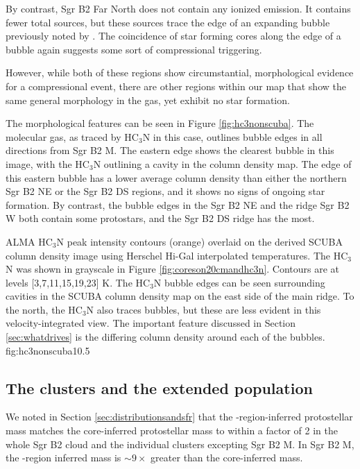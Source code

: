\documentclass[twocolumn]{aastex61}
\begin{document}
By contrast, Sgr B2 Far North does not contain any ionized emission.  It
contains fewer total sources, but these sources trace the edge of an expanding
bubble previously noted by \citet{de-Vicente1997a}.  The coincidence of star
forming cores along the edge of a bubble again suggests some sort of
compressional triggering.

However, while both of these regions show circumstantial, morphological evidence
for a compressional event, there are other regions within our map that show
the same general morphology in the gas, yet exhibit no star formation.

The morphological features can be seen in Figure \ref{fig:hc3nonscuba}.  The
molecular gas, as traced by HC$_3$N in this case, outlines bubble edges in all
directions from Sgr B2 M.  The eastern edge shows the clearest bubble in this
image, with the HC$_3$N outlining a cavity in the column density map.  The edge
of this eastern bubble has a lower average column density than either the
northern Sgr B2 NE or the Sgr B2 DS regions, and it shows no signs of ongoing
star formation.  By contrast, the bubble edges in the Sgr B2 NE and the ridge
Sgr B2 W both contain some protostars, and the Sgr B2 DS ridge has the most.

{ALMA HC$_3$N peak intensity contours (orange) overlaid on the derived SCUBA column density
image using Herschel Hi-Gal interpolated temperatures. The HC$_3$N was
shown in grayscale in Figure \ref{fig:coreson20cmandhc3n}.
Contours are at levels [3,7,11,15,19,23] K.  The  HC$_3$N bubble edges can be
seen surrounding cavities in the SCUBA column density map on the east side of
the main ridge.  To the north, the HC$_3$N also traces bubbles, but these are
less evident in this velocity-integrated view.  The important feature discussed
in Section \ref{sec:whatdrives} is the differing column density around each of
the bubbles.}
{fig:hc3nonscuba}{1}{0.5\textwidth}

\subsection{The clusters and the extended population}
We noted in Section \ref{sec:distributionsandsfr} that the \hii-region-inferred
protostellar mass matches the core-inferred protostellar mass to within a
factor of 2 in the whole Sgr B2 cloud and the individual clusters excepting Sgr
B2 M.  In Sgr B2 M, the \hii-region inferred mass is $\sim9\times$ greater than
the core-inferred mass.  
\end{document}
